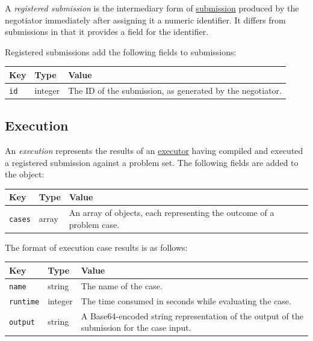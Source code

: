 \documentclass[11pt,letterpaper]{article}
\begin{document}
A \emph{registered submission} is the intermediary form of
\hyperref[formats-sub]{submission} produced by the negotiator immediately
after assigning it a numeric identifier. It differs from submissions in that it
provides a field for the identifier.

Registered submissions add the following fields to submissions:

\nopagebreak
\begin{tabulary}{\textwidth}{ | l | l | L | }
    \hline
    \textbf{Key} & \textbf{Type} & \textbf{Value} \\
    \hline
    \texttt{id} & integer & The ID of the submission, as generated by the
        negotiator. \\
    \hline
\end{tabulary}

\subsection{Execution}
\label{formats-exec}

An \emph{execution} represents the results of an
\hyperref[design-executor-judge]{executor} having compiled and executed a
registered submission against a problem set. The following fields are added to
the object:

\nopagebreak
\begin{tabulary}{\textwidth}{ | l | l | L | }
    \hline
    \textbf{Key} & \textbf{Type} & \textbf{Value} \\
    \hline
    \texttt{cases} & array & An array of objects, each representing the outcome
        of a problem case. \\
    \hline
\end{tabulary}

The format of execution case results is as follows:

\nopagebreak
\begin{tabulary}{\textwidth}{ | l | l | L | }
    \hline
    \textbf{Key} & \textbf{Type} & \textbf{Value} \\
    \hline
    \texttt{name} & string & The name of the case. \\
    \hline
    \texttt{runtime} & integer & The time consumed in seconds while evaluating
        the case. \\
    \hline
    \texttt{output} & string & A Base64-encoded string representation of the
        output of the submission for the case input. \\
    \hline
\end{tabulary}
\end{document}
